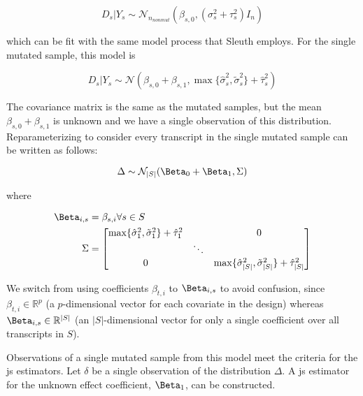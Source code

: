 \begin{equation*}
  D_s | Y_s \sim \mathcal{N}_{n_{nonmut}} \left( \beta_{s,0}, (\sigma_s^2 + \tau_s^2)I_n \right)
\end{equation*}

which can be fit with the same model process that Sleuth employs.
For the single mutated sample, this model is

\begin{equation}
  D_s | Y_s \sim \mathcal{N} \left( \beta_{s, 0} + \beta_{s, 1}, \max\{ \hat{\sigma}_s^2, \tilde{\sigma}_s^2 \} + \hat{\tau}_s^2 \right)
  \label{eqn:single_mut_model}
\end{equation}

The covariance matrix is the same as the mutated samples, but the mean $\beta_{s, 0} + \beta_{s, 1}$ is unknown and we have a single observation of this distribution.
Reparameterizing  to consider every transcript in the single mutated sample can be written as follows:

\begin{equation}
  \Delta \sim \mathcal{N}_{|S|}(\Beta_0 + \Beta_1, \Sigma) \\
\end{equation}

where

\begin{align}
  \Beta_{i,s} &= \beta_{s,i} \forall s \in S \\
  \Sigma &= \begin{bmatrix}
    \max\{ \hat{\sigma}_1^2, \tilde{\sigma}_1^2 \} + \hat{\tau}_1^2 & & 0 \\
    & \ddots & \\
    0 & & \max\{ \hat{\sigma}_{|S|}^2, \tilde{\sigma}_{|S|}^2 \} + \hat{\tau}_{|S|}^2 \\
  \end{bmatrix}
\end{align}

We switch from using coefficients $\beta_{t,i}$ to $\Beta_{i,s}$ to avoid confusion, since $\beta_{t,i} \in \mathbb{R}^p$ (a $p$-dimensional vector for each covariate in the design) whereas $\Beta_{i,s} \in \mathbb{R}^{|S|}$ (an $|S|$-dimensional vector for only a single coefficient over all transcripts in $S$).

Observations of a single mutated sample from this model meet the criteria for the \gls{js} estimators.
Let $\delta$ be a single observation of the distribution $\Delta$.
A \gls{js} estimator for the unknown effect coefficient, $\Beta_1$, can be constructed.

